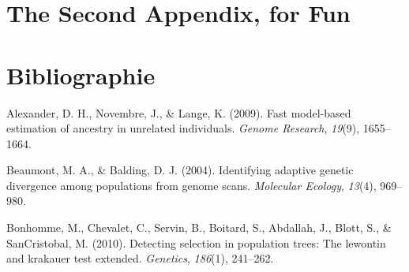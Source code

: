 \documentclass[12pt,twoside]{reedthesis}
\begin{document}
\begin{Shaded}
\begin{Highlighting}[]
  \NormalTok{(} \NormalTok{, }
                         \NormalTok{, }
                         \NormalTok{,}
                         \NormalTok{)}
  
  \StringTok{ }\NormalTok{(}\NormalTok{, }
                  \NormalTok{, }
                  \NormalTok{, }
                  \NormalTok{, }
                  \NormalTok{, }
                  \NormalTok{, }
                  \NormalTok{, }
                  \NormalTok{)}
  \end{Highlighting}
  \end{Shaded}
  
  \chapter{The Second Appendix, for
  Fun}\label{the-second-appendix-for-fun}
  
  \backmatter
  
  \chapter*{Bibliographie}\label{bibliographie}
  
  \noindent
  
  \setlength{\parindent}{-0.20in} \setlength{\leftskip}{0.20in}
  \setlength{\parskip}{8pt}
  
  \hypertarget{refs}{}
  \hypertarget{ref-alexander2009fast}{}
  Alexander, D. H., Novembre, J., \& Lange, K. (2009). Fast model-based
  estimation of ancestry in unrelated individuals. \emph{Genome Research},
  \emph{19}(9), 1655--1664.
  
  \hypertarget{ref-beaumont2004identifying}{}
  Beaumont, M. A., \& Balding, D. J. (2004). Identifying adaptive genetic
  divergence among populations from genome scans. \emph{Molecular
  Ecology}, \emph{13}(4), 969--980.
  
  \hypertarget{ref-bonhomme2010detecting}{}
  Bonhomme, M., Chevalet, C., Servin, B., Boitard, S., Abdallah, J.,
  Blott, S., \& SanCristobal, M. (2010). Detecting selection in population
  trees: The lewontin and krakauer test extended. \emph{Genetics},
  \emph{186}(1), 241--262.
  
\end{document}
